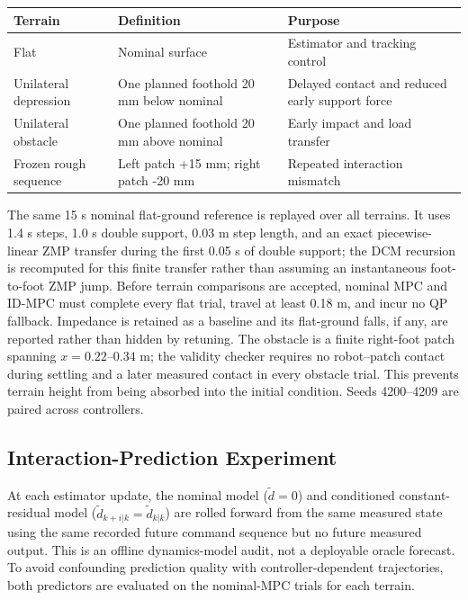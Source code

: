 \documentclass[journal]{IEEEtran}
\theoremstyle{plain}
\theoremstyle{definition}
\begin{document}
\begin{table}[!t]
\centering
\footnotesize
\begin{tabular}{lll}
\toprule
Terrain & Definition & Purpose \\
\midrule
Flat & Nominal surface & Estimator and tracking control \\
Unilateral depression & One planned foothold 20 mm below nominal & Delayed contact and reduced early support force \\
Unilateral obstacle & One planned foothold 20 mm above nominal & Early impact and load transfer \\
Frozen rough sequence & Left patch +15 mm; right patch -20 mm & Repeated interaction mismatch \\
\bottomrule
\end{tabular}
\end{table}

The same 15 s nominal flat-ground reference is replayed over all terrains. It uses 1.4 s steps, 1.0 s double support, 0.03 m step length, and an exact piecewise-linear ZMP transfer during the first 0.05 s of double support; the DCM recursion is recomputed for this finite transfer rather than assuming an instantaneous foot-to-foot ZMP jump. Before terrain comparisons are accepted, nominal MPC and ID-MPC must complete every flat trial, travel at least 0.18 m, and incur no QP fallback. Impedance is retained as a baseline and its flat-ground falls, if any, are reported rather than hidden by retuning. The obstacle is a finite right-foot patch spanning \(x=0.22\)--\(0.34\) m; the validity checker requires no robot--patch contact during settling and a later measured contact in every obstacle trial. This prevents terrain height from being absorbed into the initial condition. Seeds 4200--4209 are paired across controllers.

\subsection{Interaction-Prediction Experiment}

At each estimator update, the nominal model (\(\tilde d=0\)) and conditioned constant-residual model (\(\tilde d_{k+i|k}=\tilde d_{k|k}\)) are rolled forward from the same measured state using the same recorded future command sequence but no future measured output. This is an offline dynamics-model audit, not a deployable oracle forecast. To avoid confounding prediction quality with controller-dependent trajectories, both predictors are evaluated on the nominal-MPC trials for each terrain.
\end{document}
